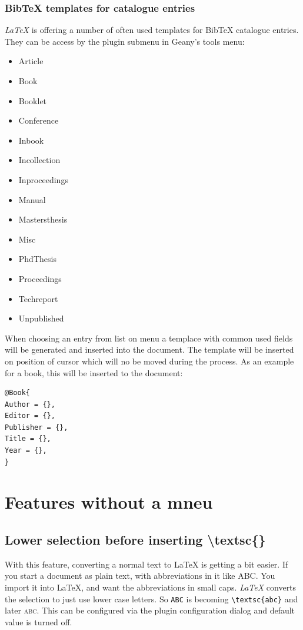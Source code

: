 \documentclass[%
paper=a4,%
fontsize=11pt,%
twoside=false,%
DIV18,%
headsepline,%
plainheadsepline,%
footsepline,%
plainfootsepline,%
bibliography=totoc,%
listof=totoc,%
BCOR10mm,%
parskip=half,%
openany,%
]{scrreprt}
\begin{document}
\subsubsection{BibTeX templates for catalogue entries}
\textit{LaTeX} is offering a number of often used templates for BibTeX
catalogue entries. They can be access by the plugin submenu in Geany's
tools menu:
\begin{itemize}
    \item Article
    \item Book
    \item Booklet
    \item Conference
    \item Inbook
    \item Incollection
    \item Inproceedings
    \item Manual
    \item Mastersthesis
    \item Misc
    \item PhdThesis
    \item Proceedings
    \item Techreport
    \item Unpublished
\end{itemize}
When choosing an entry from list on menu a templace with common used
fields will be generated and inserted into the document.
The template will be inserted on position of cursor which will
no be moved during the process. As an example for a book, this will be
inserted to the document:

\begin{lstlisting}[caption={Example of BibTeX entry for a book}]
@Book{
Author = {},
Editor = {},
Publisher = {},
Title = {},
Year = {},
}
\end{lstlisting}

\section{Features without a mneu}

\subsection{Lower selection before inserting \textbackslash{}textsc\{\}}

With this feature, converting a normal text to \LaTeX{} is getting a
bit easier. If you start a document as plain text, with
abbreviations in it like ABC. You import it into \LaTeX{}, and want
the abbreviations in small caps. \textit{LaTeX} converts the
selection to just use lower case letters. So \texttt{ABC} is
becoming \texttt{\textbackslash{}textsc\{abc\}} and later \textsc
{abc}. This can be configured via the plugin configuration dialog
and default value is turned off.
\end{document}
